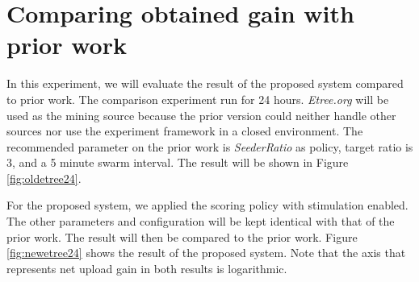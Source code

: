 \section{Comparing obtained gain with prior work}
In this experiment, we will evaluate the result of the proposed system compared to prior work. The comparison experiment run for 24 hours. \textit{Etree.org} will be used as the mining source because the prior version could neither handle other sources nor use the experiment framework in a closed environment. The recommended parameter on the prior work is \textit{SeederRatio} as policy, target ratio is 3, and a 5 minute swarm interval. The result will be shown in Figure \ref{fig:oldetree24}.

For the proposed system, we applied the scoring policy with stimulation enabled. The other parameters and configuration will be kept identical with that of the prior work. The result will then be compared to the prior work. Figure \ref{fig:newetree24} shows the result of the proposed system. Note that the axis that represents net upload gain in both results is logarithmic.

